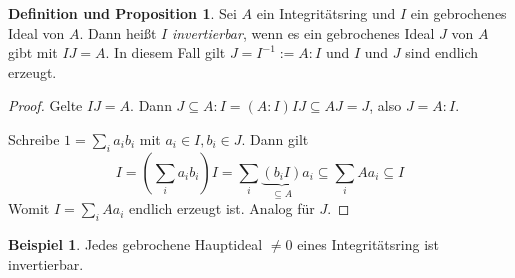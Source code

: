 \documentclass[
twoside=semi,
fontsize=12,
DIV=12, 
cleardoublepage=current,
leqno,
headings=optiontoheadandtoc, 
toc=idx
]{scrbook}
\theoremstyle{definition}
\newtheorem{beispiel}[definition]{Beispiel}
\newtheorem{def-prop}[definition]{Definition und Proposition}
\begin{document}
 	\begin{def-prop}\label{2.2.9}\hfill\newline
 		Sei $A$ ein Integrit\"atsring und $I$ ein gebrochenes Ideal von $A$. Dann hei\ss t $I$ \emph{invertierbar}, wenn es ein gebrochenes Ideal $J$ von $A$ gibt mit $IJ = A$. In diesem Fall gilt \linebreak $J=I^{-1}:=A:I$ und $I$ und $J$ sind endlich erzeugt.
 		
 		\begin{proof}
 			Gelte $IJ = A$. Dann $J \subseteq A:I = (A:I)IJ \subseteq AJ = J$, also $J = A:I$. 
 			
 			Schreibe $1 = \sum_i a_ib_i$ mit $a_i \in I, b_i \in J$. Dann gilt 
 			\[I = (\sum_i a_ib_i)I = \sum_i\underbrace{(b_iI)}_{\subseteq A}a_i \subseteq \sum_i Aa_i \subseteq I\]
 			Womit $I = \sum_i Aa_i$ endlich erzeugt ist. Analog f\"ur $J$.
 		\end{proof}
 	\end{def-prop}
 
 	\begin{beispiel}\label{2.2.10}\hfill\newline
 		Jedes gebrochene Hauptideal $\neq 0$ eines Integrit\"atsring ist invertierbar.
 	\end{beispiel}
 
\end{document}
